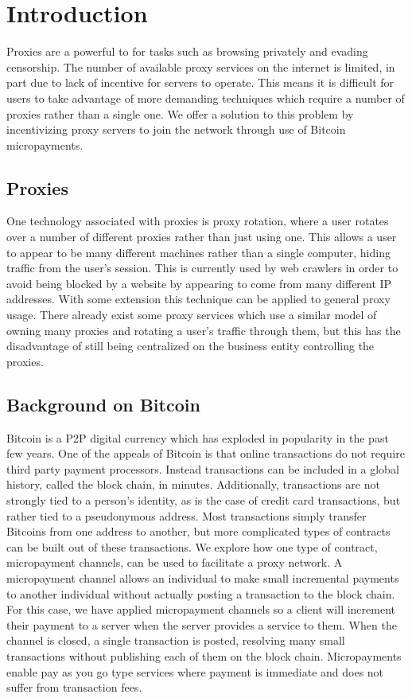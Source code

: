 \section{Introduction}
\label{sec:intro}

Proxies are a powerful to for tasks such as browsing privately and evading censorship. The number of available proxy services on the internet is limited, in part due to lack of incentive for servers to operate. This means it is difficult for users to take advantage of more demanding techniques which require a number of proxies rather than a single one. We offer a solution to this problem by incentivizing proxy servers to join the network through use of Bitcoin micropayments. 

\subsection{Proxies}

One technology associated with proxies is proxy rotation, where a user rotates over a number of different proxies rather than just using one. This allows a user to appear to be many different machines rather than a single computer, hiding traffic from the user's session. This is currently used by web crawlers in order to avoid being blocked by a website by appearing to come from many different IP addresses. With some extension this technique can be applied to general proxy usage. There already exist some proxy services which use a similar model of owning many proxies and rotating a user's traffic through them, but this has the disadvantage of still being centralized on the business entity controlling the proxies.

\subsection{Background on Bitcoin}

Bitcoin is a P2P digital currency which has exploded in popularity in the past few years. One of the appeals of Bitcoin is that online transactions do not require third party payment processors. Instead transactions can be included in a global history, called the block chain, in minutes. Additionally, transactions are not strongly tied to a person's identity, as is the case of credit card transactions, but rather tied to a pseudonymous address. Most transactions simply transfer Bitcoins from one address to another, but more complicated types of contracts can be built out of these transactions. We explore how one type of contract, micropayment channels, can be used to facilitate a proxy network. A micropayment channel allows an individual to make small incremental payments to another individual without actually posting a transaction to the block chain. For this case, we have applied micropayment channels so a client will increment their payment to a server when the server provides a service to them. When the channel is closed, a single transaction is posted, resolving many small transactions without publishing each of them on the block chain. Micropayments enable pay as you go type services where payment is immediate and does not suffer from transaction fees.


